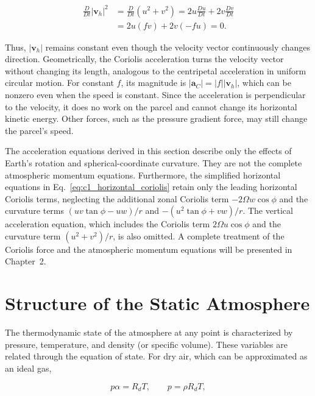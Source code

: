 \documentclass[10pt,twocolumn]{memoir}
\begin{document}
\begin{equation}
\begin{aligned}
    \frac{D}{Dt}|\mathbf{v}_h|^2
    &= \frac{D}{Dt}(u^2+v^2) = 2u\frac{Du}{Dt}+2v\frac{Dv}{Dt} \\
    &= 2u(fv)+2v(-fu)=0.
\end{aligned}
\end{equation}

Thus, $|\mathbf{v}_h|$ remains constant even though the velocity vector continuously changes direction. Geometrically, the Coriolis acceleration turns the velocity vector without changing its length, analogous to the centripetal acceleration in uniform circular motion. For constant $f$, its magnitude is $|\mathbf{a}_C|=|f||\mathbf{v}_h|$, which can be nonzero even when the speed is constant. Since the acceleration is perpendicular to the velocity, it does no work on the parcel and cannot change its horizontal kinetic energy. Other forces, such as the pressure gradient force, may still change the parcel's speed.

The acceleration equations derived in this section describe only the effects of Earth's rotation and spherical-coordinate curvature. They are not the complete atmospheric momentum equations. Furthermore, the simplified horizontal equations in Eq.~\ref{eq:c1_horizontal_coriolis} retain only the leading horizontal Coriolis terms, neglecting the additional zonal Coriolis term $-2\Omega w\cos\phi$ and the curvature terms $(uv\tan\phi-uw)/r$ and $-(u^2\tan\phi+vw)/r$. The vertical acceleration equation, which includes the Coriolis term $2\Omega u\cos\phi$ and the curvature term $(u^2+v^2)/r$, is also omitted. A complete treatment of the Coriolis force and the atmospheric momentum equations will be presented in Chapter~2.

\section{Structure of the Static Atmosphere}

The thermodynamic state of the atmosphere at any point is characterized by pressure, temperature, and density (or specific volume). These variables are related through the equation of state. For dry air, which can be approximated as an ideal gas,

\begin{equation}
    p\alpha=R_dT, \qquad p=\rho R_dT,
\label{eq:c1_ideal_gas_law}
\end{equation}
\end{document}
